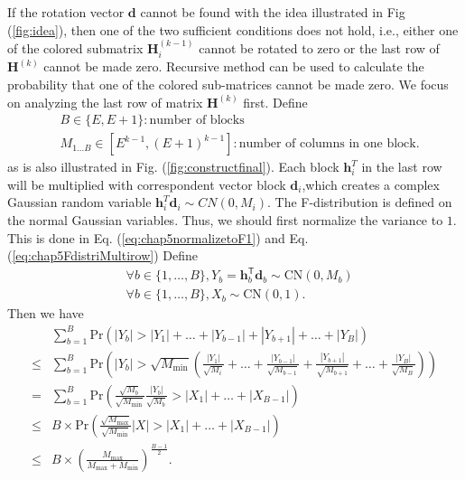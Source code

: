 \documentclass[12pt,draftclsnofoot,onecolumn,journal]{IEEEtran}
\begin{document}
If the rotation vector $\mathbf d$ cannot be found with the idea illustrated in Fig (\ref{fig:idea}), then one of the two sufficient conditions does not hold, i.e., either one of the colored submatrix $\mathbf H_i^{(k-1)}$ cannot be rotated to zero or the last row of $\mathbf H^{(k)}$ cannot be made zero. Recursive method can be used to calculate the probability that one of the colored sub-matrices cannot be made zero. We focus on analyzing the last row of matrix $\mathbf H^{(k)}$ first. Define
\begin{equation}
\begin{split}
&B\in\{E, E+1\} : \text{number of blocks}\\
&M_{1\dots B}\in[E^{k-1}, (E+1)^{k-1}]: \text{number of columns in one block}.
\end{split}
\end{equation}
as is also illustrated in Fig. (\ref{fig:constructfinal}). Each block $\mathbf h_i^T$ in the last row will be multiplied with correspondent vector block $\mathbf d_i$,which creates a complex Gaussian random variable $\mathbf h_i^T\mathbf d_i\sim CN(0, M_i)$. The F-distribution is defined on the normal Gaussian variables. Thus, we should first normalize the variance to $1$. This is done in Eq. (\ref{eq:chap5normalizetoF1}) and Eq. (\ref{eq:chap5FdistriMultirow})
Define
\begin{equation}
\begin{split}
&\forall b\in\{1,\dots,B\},Y_b=\mathbf h_b^{\mathsf{T}}\mathbf d_b\sim \mathrm{CN}(0, M_b)\\
&\forall b\in\{1,\dots,B\}, X_b\sim \mathrm{CN}(0, 1).
\label{eq:chap5normalizetoF1}
\end{split}
\end{equation}
Then we have
\begin{equation}
\begin{split}
 &\sum_{b=1}^B \mathrm{Pr}\left(|Y_b|>|Y_1|+\dots+|Y_{b-1}|+|Y_{b+1}|+\dots+|Y_B|\right) \\
\leq &\sum_{b=1}^B \mathrm{Pr}\left(|Y_b|>\sqrt{M_{\mathrm{min}}}\left(\frac {|Y_1|} {\sqrt{M_i}}+\dots+\frac {|Y_{b-1}|}{\sqrt{M_{b-1}}}+\frac{|Y_{b+1}|}{\sqrt{M_{b+1}}}+\dots+\frac{|Y_B|}{\sqrt{M_B}}\right)\right)\\
=&\sum_{b=1}^B \mathrm{Pr}\left(\frac{\sqrt{M_b}}{\sqrt{M_{\mathrm{min}}}}\frac{|Y_b|}{\sqrt{M_b}}>|X_1|+\dots+|X_{B-1}|\right)\\
\leq &B\times \mathrm{Pr}\left(\frac{\sqrt{M_{\mathrm{max}}}}{\sqrt{M_{\mathrm{min}}}}|X|>|X_1|+\dots+|X_{B-1}|\right)\\
\leq &B\times \left( \frac{M_{\mathrm{max}}}{M_{\mathrm{max}}+M_{\mathrm{min}}}\right)^\frac{B-1}{2}.
\label{eq:chap5FdistriMultirow}
\end{split}
\end{equation}
\end{document}
